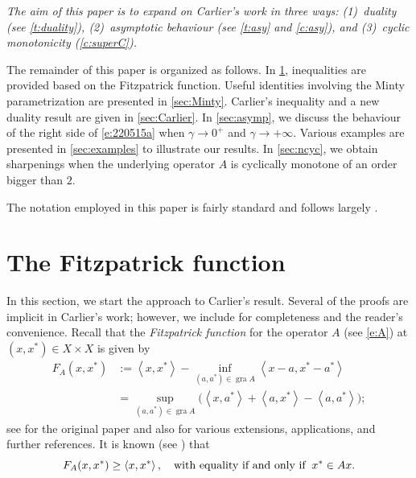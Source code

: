 \documentclass[12pt]{article}
\newcommand{\scal}[2]{\left\langle{#1},{#2}  \right\rangle}
\newcommand{\pinf}{\ensuremath{+\infty}}
\theoremstyle{definition}
\providecommand{\gr}{\operatorname{gra}}
\providecommand{\gr}{\operatorname{gra}}
\begin{document}
{\emph{The aim of this paper is to expand on Carlier's work in three ways:
(1)~duality (see \cref{t:duality}), (2)~asymptotic behaviour (see \cref{t:asy} 
and \cref{c:asy}), and (3)~cyclic monotonicity (\cref{c:superC}).}

The remainder of this paper is organized as follows. 
In \cref{sec:F_A}, inequalities are provided based on 
the Fitzpatrick function. 
Useful identities involving the Minty parametrization are presented in 
\cref{sec:Minty}. 
Carlier's inequality and a new duality result are given in \cref{sec:Carlier}. 
In \cref{sec:asymp}, we discuss the behaviour of the right side 
of \cref{e:220515a} when $\gamma\to 0^+$ and $\gamma\to\pinf$. 
Various examples are presented in \cref{sec:examples} to illustrate our
results. In \cref{sec:ncyc}, we obtain sharpenings when the underlying 
operator $A$ is cyclically monotone of an order bigger than $2$. 

The notation employed in this paper is fairly standard and follows largely \cite{BC2017}. 


\section{The Fitzpatrick function} 
\label{sec:F_A}

In this section, we start the approach to Carlier's result.  
Several of the proofs are implicit in Carlier's work; however, we
include for completeness and the reader's convenience. 
Recall that the \emph{Fitzpatrick function} for the operator $A$ 
(see \cref{e:A}) at $(x,x^*)\in X\times X$ is given by 
\begin{subequations}
\label{F_A}
\begin{align}
F_A(x,x^*) &:= 
\scal{x}{x^*} - \inf_{(a,a^*)\in\gr A}\scal{x-a}{x^*-a^*}\\
&= \sup_{(a,a^*)\in \gr A}
\big(\scal{x}{a^*}+\scal{a}{x^*}-\scal{a}{a^*}\big);
\end{align}
\end{subequations}
see \cite{SF} for the original paper and also 
\cite{Simons} for various extensions, applications, and further references. 
It is known (see \cite{SF}) that 
\begin{equation}
\label{e:220505a}
F_A(x,x^*)\geq \scal{x}{x^*},
\quad
\text{with equality if and only if\;\;}
x^*\in Ax.
\end{equation}

}
\end{document}
